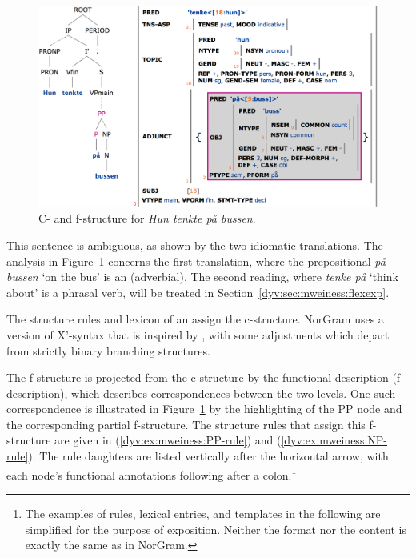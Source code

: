 \documentclass[output=paper]{langsci/langscibook}
\begin{document}
\begin{figure}
  \includegraphics[width=\textwidth]{figures/tenke-paa-bussen-highlight.png}
  \caption{C- and f-structure for \textit{Hun tenkte på bussen}.}
  \label{dyv:fig:mweiness:thinking-while-on-bus}
\end{figure}

This sentence is ambiguous, as shown by the two idiomatic translations.
The analysis in Figure~\ref{dyv:fig:mweiness:thinking-while-on-bus} concerns the first translation, where the prepositional  \textit{på bussen} `on the bus' is an  (adverbial).
The second reading, where \textit{tenke på} `think about’ is a phrasal verb, will be treated in Section~\ref{dyv:sec:mweiness:flexexp}.

The  structure rules and lexicon of an   assign the c-struc\-ture.
NorGram uses a version of X’-syntax that is inspired by \citet{bresnanlfs}, with some adjustments which depart from strictly binary branching structures.

The f-structure is projected from the c-structure by the functional description (f-description), which describes correspondences between the two levels.
One such correspondence is illustrated in Figure~\ref{dyv:fig:mweiness:thinking-while-on-bus} by the highlighting of the PP node and the corresponding partial f-structure.
The  structure rules that assign this f-structure are given in (\ref{dyv:ex:mweiness:PP-rule}) and (\ref{dyv:ex:mweiness:NP-rule}).
The rule daughters are listed vertically after the horizontal arrow, with each node's functional annotations following after a colon.\footnote{The examples of rules, lexical entries, and templates in the following are simplified for the purpose of exposition. Neither the format nor the content is exactly the same as in NorGram.}
\end{document}
